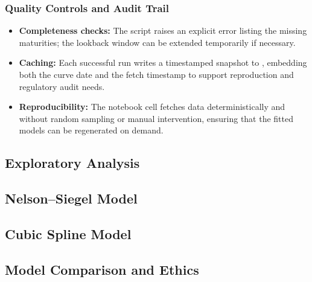 \documentclass[12pt]{article}
\newcommand{\inlinecode}[1]{\texttt{\detokenize{#1}}}
\begin{document}
\begin{spacing}{1.15}
\subsubsection{Quality Controls and Audit Trail}
\begin{itemize}
    \item \textbf{Completeness checks:} The script raises an explicit error listing the missing maturities; the lookback window can be extended temporarily if necessary.
    \item \textbf{Caching:} Each successful run writes a timestamped snapshot to \inlinecode{data/raw/}, embedding both the curve date and the fetch timestamp to support reproduction and regulatory audit needs.
    \item \textbf{Reproducibility:} The notebook cell fetches data deterministically and without random sampling or manual intervention, ensuring that the fitted models can be regenerated on demand.
\end{itemize}

\end{spacing}

\subsection{Exploratory Analysis}
\begin{spacing}{1.15}
\end{spacing}

\subsection{Nelson--Siegel Model}
\begin{spacing}{1.15}
\end{spacing}

\subsection{Cubic Spline Model}
\begin{spacing}{1.15}
\end{spacing}

\subsection{Model Comparison and Ethics}
\begin{spacing}{1.15}
\end{spacing}

\printbibliography
\end{document}

